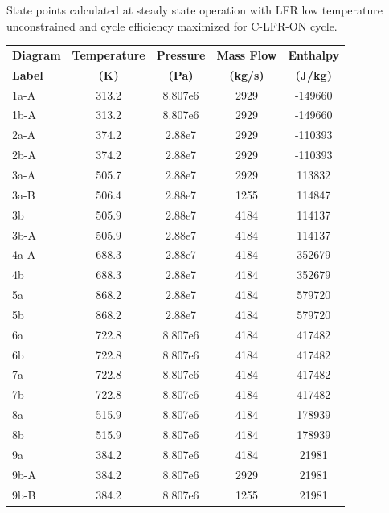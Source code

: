 \begin{paracol}{2}
\begin{specialtable}[H] 
    \caption{State points calculated at steady state operation with LFR low temperature unconstrained and cycle efficiency maximized for C-LFR-ON cycle. \label{c-lfr-on-tab-unconst}}
    \begin{tabular}{lcccc}
    \toprule
    \textbf{Diagram}	& \textbf{Temperature}	& \textbf{Pressure} &\textbf{Mass Flow} & \textbf{Enthalpy}\\
    \textbf{Label} & \textbf{(K)} & \textbf{(Pa)} &\textbf{(kg/s)} & \textbf{(J/kg)}\\
    \midrule
    1a-A		& 313.2  & 8.807e6  & 2929  & -149660\\
    1b-A		& 313.2  & 8.807e6  & 2929  & -149660\\
    2a-A		& 374.2  & 2.88e7  & 2929  & -110393\\
    2b-A		& 374.2  & 2.88e7  & 2929  & -110393\\
    3a-A		& 505.7  & 2.88e7  & 2929  & 113832\\
    3a-B		& 506.4  & 2.88e7  & 1255  & 114847\\
    3b  		& 505.9  & 2.88e7  & 4184  & 114137\\
    3b-A		& 505.9  & 2.88e7  & 4184  & 114137\\
    4a-A		& 688.3  & 2.88e7  & 4184  & 352679\\
    4b  		& 688.3  & 2.88e7  & 4184  & 352679\\
    5a  		& 868.2  & 2.88e7  & 4184  & 579720\\
    5b  		& 868.2  & 2.88e7  & 4184  & 579720\\
    6a  		& 722.8  & 8.807e6  & 4184  & 417482\\
    6b  		& 722.8  & 8.807e6  & 4184  & 417482\\
    7a  		& 722.8  & 8.807e6  & 4184  & 417482\\
    7b  		& 722.8  & 8.807e6  & 4184  & 417482\\
    8a  		& 515.9  & 8.807e6  & 4184  & 178939\\
    8b  		& 515.9  & 8.807e6  & 4184  & 178939\\
    9a  		& 384.2  & 8.807e6  & 4184  & 21981\\
    9b-A		& 384.2  & 8.807e6  & 2929  & 21981\\
    9b-B		& 384.2  & 8.807e6  & 1255  & 21981\\
    \bottomrule
    \end{tabular}
    \begin{tabular}{lcc}

\end{tabular}
\end{specialtable}
\end{paracol}
